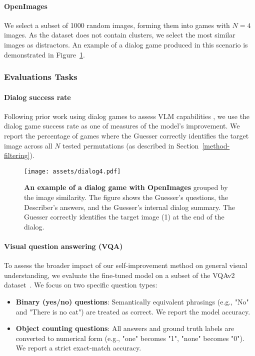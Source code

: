 \paragraph{OpenImages}
We select a subset of \num{1000} random images, forming them into games with $N=4$ images.
As the dataset does not contain clusters, we select the most similar images \citep{jia2021align} as distractors.
An example of a dialog game produced in this scenario is demonstrated in Figure~\ref{fig:open_image_example_dialog}.

\subsubsection{Evaluations Tasks}
\paragraph{Dialog success rate}

Following prior work using dialog games to assess VLM capabilities \citep{hakimov2024usinggameplayinvestigate}, we use the dialog game success rate as one of measures of the model's improvement.
We report the percentage of games where the Guesser correctly identifies the target image across all $N$ tested permutations (as described in Section~\ref{method-filtering}).  

\begin{figure}[t]
    \centering
    \texttt{[image: assets/dialog4.pdf]}
    \caption{\textbf{An example of a dialog game with OpenImages} grouped by the image similarity.
    The figure shows the Guesser's questions, the Describer's answers, and the Guesser's internal dialog summary.  The Guesser correctly identifies the target image (1) at the end of the dialog.}
    \vspace{-3mm}
    \label{fig:open_image_example_dialog}
\end{figure}



\paragraph{Visual question answering (VQA)}

To assess the broader impact of our self-improvement method on general visual understanding, we evaluate the fine-tuned model on a subset of the VQAv2 dataset~\citep{goyal2017making}.
We focus on two specific question types:

\begin{itemize}
    \item \textbf{Binary (yes/no) questions}: Semantically equivalent phrasings (e.g., "No" and "There is no cat") are treated as correct. We report the model accuracy.
    \item \textbf{Object counting questions}: All answers and ground truth labels are converted to numerical form (e.g., "one" becomes "1", "none" becomes "0"). We report a strict exact-match accuracy.
\end{itemize}

